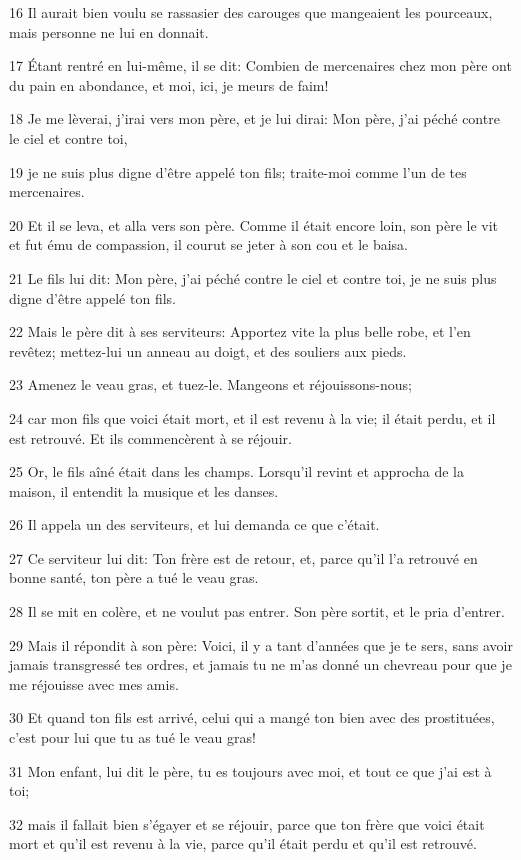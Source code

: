 \par 16 Il aurait bien voulu se rassasier des carouges que mangeaient les pourceaux, mais personne ne lui en donnait.
\par 17 Étant rentré en lui-même, il se dit: Combien de mercenaires chez mon père ont du pain en abondance, et moi, ici, je meurs de faim!
\par 18 Je me lèverai, j'irai vers mon père, et je lui dirai: Mon père, j'ai péché contre le ciel et contre toi,
\par 19 je ne suis plus digne d'être appelé ton fils; traite-moi comme l'un de tes mercenaires.
\par 20 Et il se leva, et alla vers son père. Comme il était encore loin, son père le vit et fut ému de compassion, il courut se jeter à son cou et le baisa.
\par 21 Le fils lui dit: Mon père, j'ai péché contre le ciel et contre toi, je ne suis plus digne d'être appelé ton fils.
\par 22 Mais le père dit à ses serviteurs: Apportez vite la plus belle robe, et l'en revêtez; mettez-lui un anneau au doigt, et des souliers aux pieds.
\par 23 Amenez le veau gras, et tuez-le. Mangeons et réjouissons-nous;
\par 24 car mon fils que voici était mort, et il est revenu à la vie; il était perdu, et il est retrouvé. Et ils commencèrent à se réjouir.
\par 25 Or, le fils aîné était dans les champs. Lorsqu'il revint et approcha de la maison, il entendit la musique et les danses.
\par 26 Il appela un des serviteurs, et lui demanda ce que c'était.
\par 27 Ce serviteur lui dit: Ton frère est de retour, et, parce qu'il l'a retrouvé en bonne santé, ton père a tué le veau gras.
\par 28 Il se mit en colère, et ne voulut pas entrer. Son père sortit, et le pria d'entrer.
\par 29 Mais il répondit à son père: Voici, il y a tant d'années que je te sers, sans avoir jamais transgressé tes ordres, et jamais tu ne m'as donné un chevreau pour que je me réjouisse avec mes amis.
\par 30 Et quand ton fils est arrivé, celui qui a mangé ton bien avec des prostituées, c'est pour lui que tu as tué le veau gras!
\par 31 Mon enfant, lui dit le père, tu es toujours avec moi, et tout ce que j'ai est à toi;
\par 32 mais il fallait bien s'égayer et se réjouir, parce que ton frère que voici était mort et qu'il est revenu à la vie, parce qu'il était perdu et qu'il est retrouvé.

